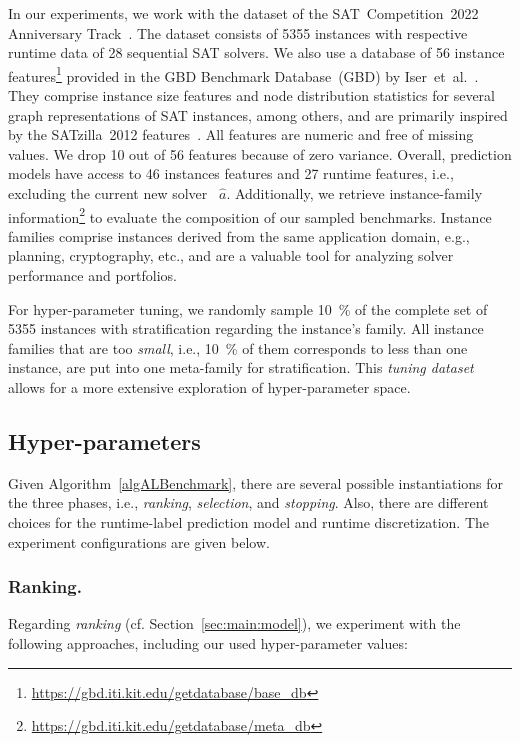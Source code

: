\documentclass[runningheads]{llncs}
\begin{document}
In our experiments, we work with the dataset of the SAT~Competition~2022 Anniversary Track~\cite{sat2022}.
The dataset consists of 5355 instances with respective runtime data of 28 sequential SAT solvers.
We also use a database of 56 instance features\footnote{\url{https://gbd.iti.kit.edu/getdatabase/base_db}} provided in the GBD Benchmark Database~(GBD) by Iser~et~al.~\cite{IserS18}.
They comprise instance size features and node distribution statistics for several graph representations of SAT instances, among others, and are primarily inspired by the SATzilla~2012 features~\cite{features}.
All features are numeric and free of missing values.
We drop 10 out of 56 features because of zero variance.
Overall, prediction models have access to 46 instances features and 27 runtime features, i.e., excluding the current new solver~ $\hat{a}$.
Additionally, we retrieve instance-family information\footnote{\url{https://gbd.iti.kit.edu/getdatabase/meta_db}} to evaluate the composition of our sampled benchmarks.
Instance families comprise instances derived from the same application domain, e.g., planning, cryptography, etc., and are a valuable tool for analyzing solver performance and portfolios.

For hyper-parameter tuning, we randomly sample \SI{10}{\%} of the complete set of 5355 instances with stratification regarding the instance's family.
All instance families that are too \emph{small}, i.e., \SI{10}{\%} of them corresponds to less than one instance, are put into one meta-family for stratification.
This \emph{tuning dataset} allows for a more extensive exploration of hyper-parameter space.

\subsection{Hyper-parameters}
\label{sec:exdesign:hyper}

Given Algorithm~\ref{algALBenchmark}, there are several possible instantiations for the three phases, i.e., \emph{ranking}, \emph{selection}, and \emph{stopping}.
Also, there are different choices for the runtime-label prediction model and runtime discretization.
The experiment configurations are given below.

\subsubsection{Ranking.}

Regarding \emph{ranking} (cf. Section~\ref{sec:main:model}), we experiment with the following approaches, including our used hyper-parameter values:
\end{document}
